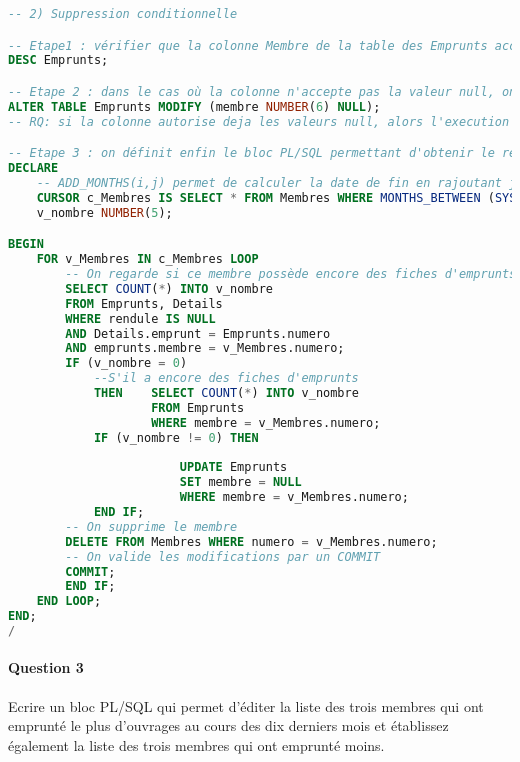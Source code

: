 \documentclass[10pt, oneside]{article}
\begin{document}
\begin{lstlisting}[language=sql, title=Question 2, label=QIV2]
-- 2) Suppression conditionnelle

-- Etape1 : vérifier que la colonne Membre de la table des Emprunts accepte les valeurs null.
DESC Emprunts;

-- Etape 2 : dans le cas où la colonne n'accepte pas la valeur null, on doit modifier la définition de la table
ALTER TABLE Emprunts MODIFY (membre NUMBER(6) NULL);
-- RQ: si la colonne autorise deja les valeurs null, alors l'execution du script se termine par une erreur.

-- Etape 3 : on définit enfin le bloc PL/SQL permettant d'obtenir le résultat souhaité
DECLARE
	-- ADD_MONTHS(i,j) permet de calculer la date de fin en rajoutant j mois à la date i
	CURSOR c_Membres IS SELECT * FROM Membres WHERE MONTHS_BETWEEN (SYSDATE, ADD_MONTHS(adhesion, duree)) > 24;
	v_nombre NUMBER(5);

BEGIN
	FOR v_Membres IN c_Membres LOOP
		-- On regarde si ce membre possède encore des fiches d'emprunts
		SELECT COUNT(*) INTO v_nombre 
		FROM Emprunts, Details 
		WHERE rendule IS NULL 
		AND Details.emprunt = Emprunts.numero 
		AND emprunts.membre = v_Membres.numero;	
		IF (v_nombre = 0)
			--S'il a encore des fiches d'emprunts
			THEN 	SELECT COUNT(*) INTO v_nombre 
					FROM Emprunts 
					WHERE membre = v_Membres.numero;
			IF (v_nombre != 0) THEN 
	
						UPDATE Emprunts 
						SET membre = NULL 
						WHERE membre = v_Membres.numero;
			END IF;
		-- On supprime le membre
		DELETE FROM Membres WHERE numero = v_Membres.numero;
		-- On valide les modifications par un COMMIT
		COMMIT;
		END IF;
	END LOOP;
END;
/
\end{lstlisting}


\paragraph{Question 3} Ecrire un bloc PL/SQL qui permet d'éditer la liste des trois membres qui ont emprunté le plus d'ouvrages au cours des dix derniers mois et établissez également la liste des trois membres qui ont emprunté moins.
\end{document}
